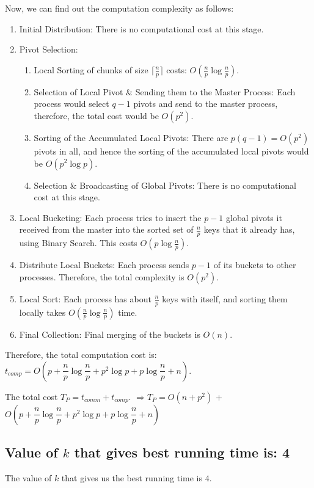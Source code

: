 \documentclass{article}
\begin{document}
Now, we can find out the computation complexity as follows:
\begin{enumerate}
\item Initial Distribution: There is no computational cost at this stage.
\item Pivot Selection: 
  \begin{enumerate}
  \item Local Sorting of chunks of size $\lceil\frac{n}{p}\rceil$ costs: $O(\frac{n}{p}\log{\frac{n}{p}})$.   
  \item Selection of Local Pivot \& Sending them to the Master 
  Process: Each process would select $q-1$ pivots and send to 
  the master process, therefore, the total cost would be $O(p^2)$.
  \item Sorting of the Accumulated Local Pivots: There are $p(q-1) 
  = O(p^2)$ pivots in all, and hence the sorting of the 
  accumulated local pivots would be $O(p^2\log{p})$.
  \item Selection \& Broadcasting of Global Pivots: There is no
  computational cost at this stage.
  \end{enumerate}
\item Local Bucketing: Each process tries to insert the $p-1$ 
global pivots it received from the master into the sorted set of 
$\frac{n}{p}$ keys that it already has, using Binary Search. 
This costs $O(p\log{\frac{n}{p}})$.
\item Distribute Local Buckets: Each process sends $p-1$ of its
buckets to other processes. Therefore, the total complexity is
$O(p^2)$.
\item Local Sort: Each process has about $\frac{n}{p}$ keys
with itself, and sorting them locally takes 
$O(\frac{n}{p}\log{\frac{n}{p}})$ time. 
\item Final Collection: Final merging of the buckets is $O(n)$.
\end{enumerate}
Therefore, the total computation cost is: 
$t_{comp} = O\left(p + \dfrac{n}{p}\log{\dfrac{n}{p}} + 
p^2\log{p} + p\log{\dfrac{n}{p}} + n\right)$.

The total cost $T_P = t_{comm} + t_{comp}$. 
$\Rightarrow T_P = O(n + p^2)$ +  
$ O\left(p + \dfrac{n}{p}\log{\dfrac{n}{p}} + 
p^2\log{p} + p\log{\dfrac{n}{p}} + n\right)$ 
\subsection{Value of $k$ that gives best running time is: 4}

The value of $k$ that gives us the best running time is $4$.
\end{document}
